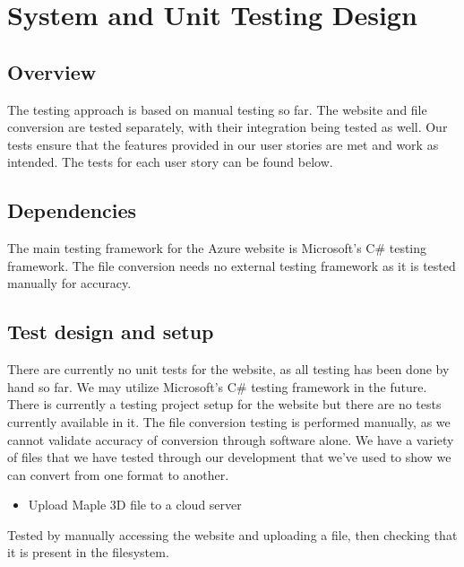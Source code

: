 

\chapter{System and Unit Testing Design}


\section{Overview}
The testing approach is based on manual testing so far. 
The website and file conversion are tested separately, with their integration being tested as well.
Our tests ensure that the features provided in our user stories are met and work as intended.
The tests for each user story can be found below.

\section{Dependencies}
The main testing framework for the Azure website is Microsoft's C\# testing framework. 
The file conversion needs no external testing framework as it is tested manually for accuracy.

\section{Test design and setup}
There are currently no unit tests for the website, as all testing has been done by hand so far.
We may utilize Microsoft's C\# testing framework in the future. There is currently a testing project setup for the website but there are no tests currently available in it.
The file conversion testing is performed manually, as we cannot validate accuracy of conversion through software alone. We have a variety of files that we have tested through our development that we've used to show we can convert from one format to another.

\begin{itemize} \item Upload Maple 3D file to a cloud server \end{itemize}
\hspace{7mm}    
    Tested by manually accessing the website and uploading a file, then checking that it is present in the filesystem.

